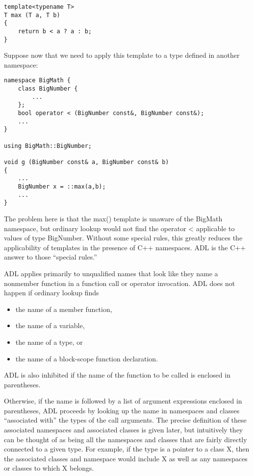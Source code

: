 \begin{lstlisting}[style=styleCXX]
template<typename T>
T max (T a, T b)
{
	return b < a ? a : b;
}
\end{lstlisting}

Suppose now that we need to apply this template to a type defined in another namespace:

\begin{lstlisting}[style=styleCXX]
namespace BigMath {
	class BigNumber {
		...
	};
	bool operator < (BigNumber const&, BigNumber const&);
	...
}

using BigMath::BigNumber;

void g (BigNumber const& a, BigNumber const& b)
{
	...
	BigNumber x = ::max(a,b);
	...
}
\end{lstlisting}

The problem here is that the max() template is unaware of the BigMath namespace, but ordinary lookup would not find the operator < applicable to values of type BigNumber. Without some special rules, this greatly reduces the applicability of templates in the presence of C++ namespaces. ADL is the C++ answer to those “special rules.”



ADL applies primarily to unqualified names that look like they name a nonmember function in a function call or operator invocation. ADL does not happen if ordinary lookup finds

\begin{itemize}
\item 
the name of a member function,

\item 
the name of a variable,

\item 
the name of a type, or

\item 
the name of a block-scope function declaration.
\end{itemize}

ADL is also inhibited if the name of the function to be called is enclosed in parentheses.

Otherwise, if the name is followed by a list of argument expressions enclosed in parentheses, ADL proceeds by looking up the name in namespaces and classes “associated with” the types of the call arguments. The precise definition of these associated namespaces and associated classes is given later, but intuitively they can be thought of as being all the namespaces and classes that are fairly directly connected to a given type. For example, if the type is a pointer to a class X, then the associated classes and namespace would include X as well as any namespaces or classes to which X belongs.

